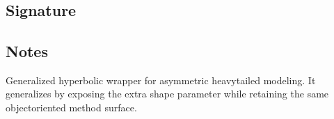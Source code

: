 \documentclass[letterpaper,10pt,english]{sphinxmanual}
\begin{document}
\section{}
\label{\detokenize{object_api_reference:gh}}

\subsection{Signature}
\label{\detokenize{object_api_reference:id64}}
\begin{sphinxVerbatim}[commandchars=\\\{\}]

\end{sphinxVerbatim}


\subsection{Notes}
\label{\detokenize{object_api_reference:id65}}
\sphinxAtStartPar
Generalized hyperbolic wrapper for asymmetric heavy\sphinxhyphen{}tailed modeling. It generalizes  by exposing the extra shape parameter  while retaining the same object\sphinxhyphen{}oriented method surface.
\end{document}
